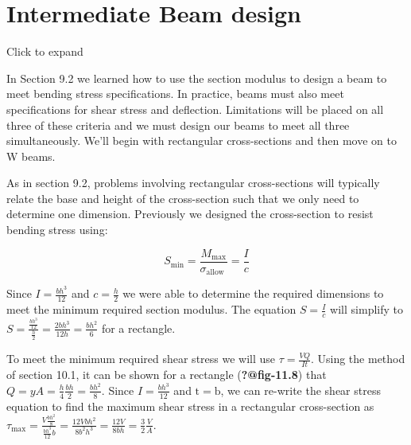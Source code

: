 \documentclass[
  letterpaper,
  DIV=11,
  numbers=noendperiod]{scrreprt}
\begin{document}
\section{Intermediate Beam design}\label{intermediate-beam-design}

Click to expand

In Section 9.2 we learned how to use the section modulus to design a
beam to meet bending stress specifications. In practice, beams must also
meet specifications for shear stress and deflection. Limitations will be
placed on all three of these criteria and we must design our beams to
meet all three simultaneously. We'll begin with rectangular
cross-sections and then move on to W beams.

As in section 9.2, problems involving rectangular cross-sections will
typically relate the base and height of the cross-section such that we
only need to determine one dimension. Previously we designed the
cross-section to resist bending stress using:

\[
S_{\min }=\frac{M_{\max }}{\sigma_{\text {allow }}}=\frac{I}{c}
\]

Since \(I=\frac{b h^{3}}{12}\) and \(c=\frac{h}{2}\) we were able to
determine the required dimensions to meet the minimum required section
modulus. The equation \(S=\frac{I}{c}\) will simplify to
\(S=\frac{\frac{b h^{3}}{12}}{\frac{h}{2}}=\frac{2 b h^{3}}{12 h}=\frac{b h^{2}}{6}\)
for a rectangle.

To meet the minimum required shear stress we will use
\(\tau=\frac{V Q}{I t}\). Using the method of section 10.1, it can be
shown for a rectangle (\textbf{?@fig-11.8}) that
\(Q=y A=\frac{h}{4} \frac{b h}{2}=\frac{b h^{2}}{8}\). Since
\(I=\frac{b h^{3}}{12}\) and \(\mathrm{t}=\mathrm{b}\), we can re-write
the shear stress equation to find the maximum shear stress in a
rectangular cross-section as
\(\tau_{\max }=\frac{V \frac{b h^{2}}{8}}{\frac{b h^{3}}{12} b}=\frac{12 V b h^{2}}{8 b^{2} h^{3}}=\frac{12 V}{8 b h}=\frac{3}{2} \frac{V}{A}\).
\end{document}
